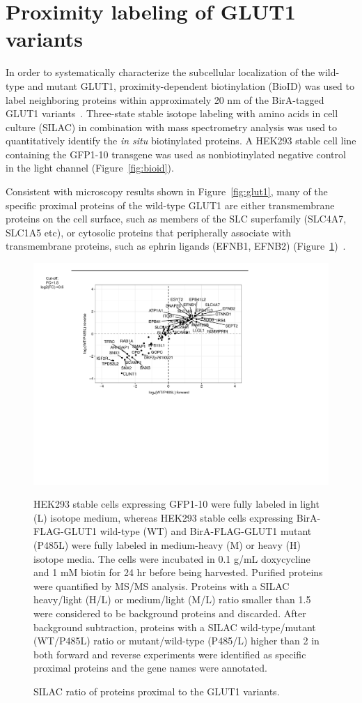 \section{Proximity labeling of GLUT1 variants}
In order to systematically characterize the subcellular localization of the wild-type and mutant GLUT1, proximity-dependent biotinylation (BioID) was used to label neighboring proteins within approximately 20 nm of the BirA-tagged GLUT1 variants~\cite{Kim,Dong}. Three-state stable isotope labeling with amino acids in cell culture (SILAC) in combination with mass spectrometry analysis was used to quantitatively identify the \textit{in situ} biotinylated proteins. A HEK293 stable cell line containing the GFP1-10 transgene was used as nonbiotinylated negative control in the light channel (Figure~\ref{fig:bioid}). 

Consistent with microscopy results shown in Figure~\ref{fig:glut1}, many of the specific proximal proteins of the wild-type GLUT1 are either transmembrane proteins on the cell surface, such as members of the SLC superfamily (SLC4A7, SLC1A5 etc), or cytosolic proteins that peripherally associate with transmembrane proteins, such as ephrin ligands (EFNB1, EFNB2) (Figure~\ref{fig:bioid2})~\cite{He,Himanen}. 
\begin{figure}[h]
\centering
\includegraphics[scale=0.7]{Figures/bioid2}
\caption{SILAC ratio of proteins proximal to the GLUT1 variants.}
\vspace*{-3mm}
\small \justify
HEK293 stable cells expressing GFP1-10 were fully labeled in light (L) isotope medium, whereas HEK293 stable cells expressing BirA-FLAG-GLUT1 wild-type (WT) and BirA-FLAG-GLUT1 mutant (P485L) were fully labeled in medium-heavy (M) or heavy (H) isotope media. The cells were incubated in 0.1 \textmu g/mL doxycycline and 1 mM biotin for 24 hr before being harvested. Purified proteins were quantified by MS/MS analysis. Proteins with a SILAC heavy/light (H/L) or medium/light (M/L) ratio smaller than 1.5 were considered to be background proteins and discarded. After background subtraction, proteins with a SILAC wild-type/mutant (WT/P485L) ratio or mutant/wild-type (P485/L) higher than 2 in both forward and reverse experiments were identified as specific proximal proteins and the gene names were annotated.
\label{fig:bioid2}
\end{figure}

